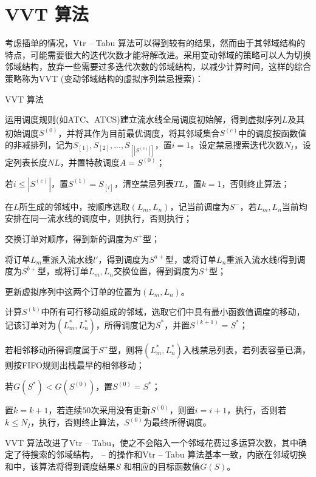 \section{VVT 算法}
考虑插单的情况，Vtr -- Tabu 算法可以得到较有的结果，然而由于其邻域结构的特点，可能需要很大的迭代次数才能将解改进。采用变动邻域的策略可以人为切换邻域结构，放弃一些需要过多迭代次数的邻域结构，以减少计算时间，这样的综合策略称为VVT (变动邻域结构的虚拟序列禁忌搜索)：
\begin{algori}
VVT 算法\label{alg:vvt}
\begin{asparaenum}
\renewcommand{\labelenumi}{\bf Step\theenumi~}
\item 运用调度规则(如ATC、ATCS)建立流水线全局调度初始解，得到虚拟序列$L$及其初始调度$S^{(0)}$，并将其作为目前最优调度，将其邻域集合$\overline{S^{(c)}}$中的调度按函数值的非减排列，记为$S_{[1]},S_{[2]},...,S_{[|S^{(c)}|]}$，置$i = 1$。设定禁忌搜索迭代次数$N_I$，设定列表长度$NL$，并置特赦调度$A = S^{(0)}$；
\item 若$i \le |S^{(c)}|$，置$S^{(1)} = S_{[i]}$，清空禁忌列表$TL$，置$k = 1$，否则终止算法；
\item 在$L$所生成的邻域中，按顺序选取$(L_m, L_n)$，记当前调度为$S^-$，若$L_m, L_n$当前均安排在同一流水线的调度中，则执行，否则执行；
\item 交换订单对顺序，得到新的调度为$S^+$型；
\item 将订单$L_m$重派入流水线$l'$，得到调度为$S^{a+}$型，或将订单$L_n$重派入流水线$l$得到调度为$S^{b+}$型，或将订单$L_m, L_n$交换位置，得到调度为$S^+$型；
\item 更新虚拟序列中这两个订单的位置为$(L_m, L_n)$。
\item 计算$S^{(k)}$中所有可行移动组成的邻域，选取它们中具有最小函数值调度的移动，记该订单对为$(L_m^*, L_n^*)$，所得调度记为$S^*$，并置$S^{(k+1)} = S^*$；
\item 若相邻移动所得调度属于$S^+$型，则将$(L_m^*, L_n^*)$入栈禁忌列表，若列表容量已满，则按FIFO规则出栈最早的相邻移动；
\item 若$G(S^*) < G(S^{(0)})$，置$S^{(0)} = S^*$；
\item 置$k = k + 1$，若连续$50$次采用没有更新$S^{(0)}$，则置$i = i+1$，执行，否则若$k\le N_I$，执行，否则终止算法，$S^{(0)}$为最终所得调度。
\end{asparaenum}
\end{algori}

VVT 算法改进了Vtr -- Tabu，使之不会陷入一个邻域花费过多运算次数，其中确定了待搜索的邻域结构， -- 的操作和Vtr -- Tabu 算法基本一致，内嵌在邻域切换和中，该算法将得到调度结果$S$ 和相应的目标函数值$G(S)$。


